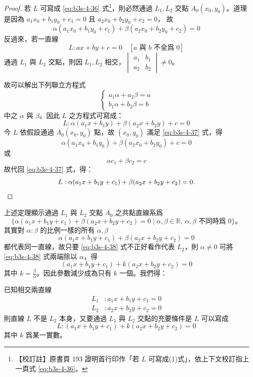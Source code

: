 \begin{proof}
若 $L$ 可寫成 \eqref{eq:b3s-4-36} 式\footnote{\label{note:b3s-ch4-p193-formula-ref}【校訂註】原書頁 193 證明首行印作「若 $L$ 可寫成(1)式」，依上下文校訂指上一頁式 \eqref{eq:b3s-4-36}。}，則必然通過 $L_1, L_2$ 交點 $A_0(x_0, y_0)$。道理是因為 $a_1 x_0 + b_1 y_0 + c_1 = 0$ 且 $a_2 x_0 + b_2 y_0 + c_2 = 0$，
故
\[
\alpha(a_1 x_0 + b_1 y_0 + c_1) + \beta(a_2 x_0 + b_2 y_0 + c_2) = 0
\]
反過來，若一直線
\[
L : ax + by + c = 0 \quad [a \text{ 與 } b \text{ 不全爲 } 0]
\]
通過 $L_1$ 與 $L_2$ 交點，則因 $L_1, L_2$ 相交，$\begin{vmatrix} a_1 & b_1 \\ a_2 & b_2 \end{vmatrix} \neq 0$。

故可以解出下列聯立方程式
\[
\begin{cases}
a_1 \alpha + a_2 \beta = a \\
b_1 \alpha + b_2 \beta = b
\end{cases}
\]
中之 $\alpha$ 與 $\beta$。因此 $L$ 之方程式可寫成：
\begin{equation}
L : \alpha(a_1 x + b_1 y) + \beta(a_2 x + b_2 y) + c = 0
\label{eq:b3s-4-37}
\end{equation}
今 $L$ 依假設通過 $A_0(x_0, y_0)$ 點，故 $(x_0, y_0)$ 滿足 \eqref{eq:b3s-4-37} 式，得
\[
\alpha(a_1 x_0 + b_1 y_0) + \beta(a_2 x_0 + b_2 y_0) + c = 0
\]
或
\[
\alpha c_1 + \beta c_2 = c
\]
故代回 \eqref{eq:b3s-4-37} 式，得：
\[
L : \alpha(a_1 x + b_1 y + c_1) + \beta(a_2 x + b_2 y + c_2) = 0. \qedhere
\]
\end{proof}

上述定理顯示通過 $L_1$ 與 $L_2$ 交點 $A_0$ 之共點直線系爲
\[
\{\alpha(a_1 x + b_1 y + c_1) + \beta(a_2 x + b_2 y + c_2) = 0 \mid \alpha, \beta \in \mathbb{R},\ \alpha, \beta \text{ 不同時爲 } 0\}\text{。}
\]
其實對 $\alpha : \beta$ 的比例一樣的所有 $\alpha, \beta$
\begin{equation}
\alpha(a_1 x + b_1 y + c_1) + \beta(a_2 x + b_2 y + c_2) = 0
\label{eq:b3s-4-38}
\end{equation}
都代表同一直線，故只要 \eqref{eq:b3s-4-38} 式不正好看作代表 $L_2$，則 $\alpha \neq 0$ 可將 \eqref{eq:b3s-4-38} 式兩端除以 $\alpha$，得
\[
(a_1 x + b_1 y + c_1) + k(a_2 x + b_2 y + c_2) = 0
\]
其中 $k = \frac{\beta}{\alpha}$。因此參數減少成為只有 $k$ 一個。我們得：

\begin{theorem}
已知相交兩直線
\begin{align*}
L_1 &: a_1 x + b_1 y + c_1 = 0 \\
L_2 &: a_2 x + b_2 y + c_2 = 0
\end{align*}
則直線 $L$ 不是 $L_2$ 本身，又要通過 $L_1$ 與 $L_2$ 交點的充要條件是 $L$ 可以寫成
\[
L : (a_1 x + b_1 y + c_1) + k(a_2 x + b_2 y + c_2) = 0
\]
其中 $k$ 爲某一實數。
\end{theorem}

